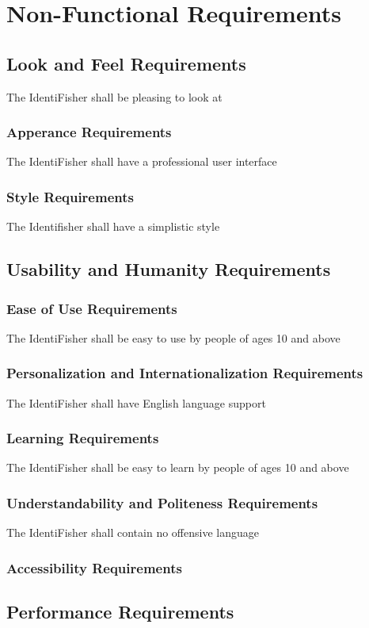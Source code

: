 \documentclass{article}
\begin{document}
\section{Non-Functional Requirements}

\subsection{Look and Feel Requirements}
The IdentiFisher shall be pleasing to look at
\subsubsection{Apperance Requirements}
The IdentiFisher shall have a professional user interface
\subsubsection{Style Requirements}
The Identifisher shall have a simplistic style

\subsection{Usability and Humanity Requirements}
\subsubsection{Ease of Use Requirements}
The IdentiFisher shall be easy to use by people of ages 10 and above
\subsubsection{Personalization and Internationalization Requirements}
The IdentiFisher shall have English language support
\subsubsection{Learning Requirements}
The IdentiFisher shall be easy to learn by people of ages 10 and above
\subsubsection{Understandability and Politeness Requirements}
The IdentiFisher shall contain no offensive language
\subsubsection{Accessibility Requirements}

\subsection{Performance Requirements}
\end{document}
